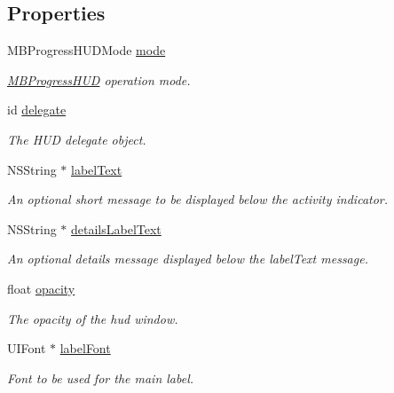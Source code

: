 \subsection*{Properties}
\begin{CompactItemize}
\item 
MBProgressHUDMode \hyperlink{interface_m_b_progress_h_u_d_ce77eaaf507e86fe56436f7ee7b6fdc9}{mode}
\begin{CompactList}\small\item\em \hyperlink{interface_m_b_progress_h_u_d}{MBProgressHUD} operation mode. \item\end{CompactList}\item 
id \hyperlink{interface_m_b_progress_h_u_d_f50bbbc26208854ae0af6f76bbab35d6}{delegate}
\begin{CompactList}\small\item\em The HUD delegate object. \item\end{CompactList}\item 
NSString $\ast$ \hyperlink{interface_m_b_progress_h_u_d_e43d72850b8dd657db1b383be0566093}{labelText}
\begin{CompactList}\small\item\em An optional short message to be displayed below the activity indicator. \item\end{CompactList}\item 
NSString $\ast$ \hyperlink{interface_m_b_progress_h_u_d_b5ad528a731e513b39e3183129af1f37}{detailsLabelText}
\begin{CompactList}\small\item\em An optional details message displayed below the labelText message. \item\end{CompactList}\item 
float \hyperlink{interface_m_b_progress_h_u_d_24ab5e37917e3489d6add081324a49ff}{opacity}
\begin{CompactList}\small\item\em The opacity of the hud window. \item\end{CompactList}\item 
UIFont $\ast$ \hyperlink{interface_m_b_progress_h_u_d_85b03f18b8313f4c3efc2002ad79ff27}{labelFont}
\begin{CompactList}\small\item\em Font to be used for the main label. \item\end{CompactList}\item 

\end{CompactItemize}
